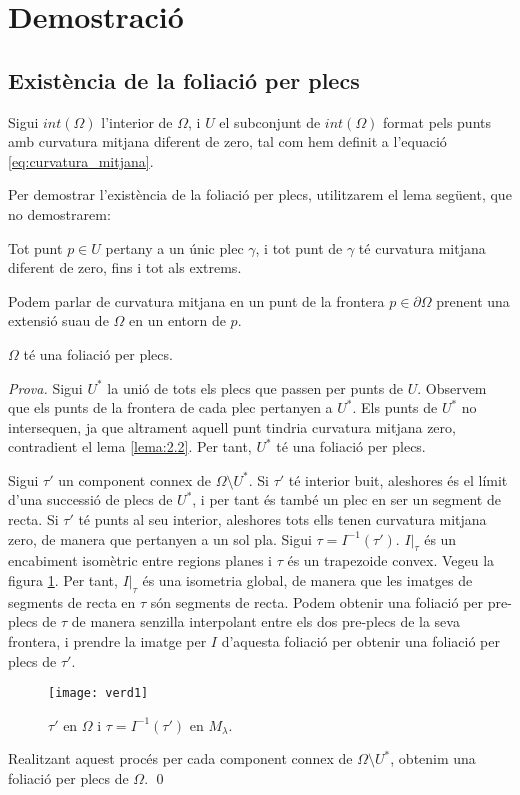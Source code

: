 \section{Demostració}
\subsection{Existència de la foliació per plecs}
Sigui $int(\Omega)$ l'interior de $\Omega$, i $U$ el subconjunt de $int(\Omega)$ format pels punts amb curvatura mitjana diferent de zero, tal com hem definit a l'equació \eqref{eq:curvatura_mitjana}.

Per demostrar l'existència de la foliació per plecs, utilitzarem el lema següent, que no demostrarem:
\begin{lema}\label{lema:2.2}
    Tot punt $p\in U$ pertany a un únic plec $\gamma$, i tot punt de $\gamma$ té curvatura mitjana diferent de zero, fins i tot als extrems.
\end{lema}
Podem parlar de curvatura mitjana en un punt de la frontera $p\in\partial \Omega$ prenent una extensió suau de $\Omega$ en un entorn de $p$.

\begin{teo}\label{teo:existencia_foliacio_plecs}
    $\Omega$ té una foliació per plecs.
\end{teo}
{
    \color{black}
    \textit{Prova.}
    Sigui $U^*$ la unió de tots els plecs que passen per punts de $U$. Observem que els punts de la frontera de cada plec pertanyen a $U^*$. Els punts de $U^*$ no intersequen, ja que altrament aquell punt tindria curvatura mitjana zero, contradient el lema \ref{lema:2.2}. Per tant, $U^*$ té una foliació per plecs. 

    Sigui $\tau'$ un component connex de $\Omega\setminus U^*$.
    Si $\tau'$ té interior buit, aleshores és el límit d'una successió de plecs de $U^*$, i per tant és també un plec en ser un segment de recta.
    Si $\tau'$ té punts al seu interior, aleshores tots ells tenen curvatura mitjana zero, de manera que pertanyen a un sol pla.
    Sigui $\tau = I^{-1}(\tau')$. $I|_{\tau}$ és un encabiment isomètric entre regions planes i $\tau$ és un trapezoide convex. Vegeu la figura \ref{fig:trapezoide}. Per tant, $I|_{\tau}$ és una isometria global, de manera que les imatges de segments de recta en $\tau$ són segments de recta. Podem obtenir una foliació per pre-plecs de $\tau$ de manera senzilla interpolant entre els dos pre-plecs de la seva frontera, i prendre la imatge per $I$ d'aquesta foliació per obtenir una foliació per plecs de $\tau'$.
    
    \begin{figure}[htbp]
        \centering
        \quad
        \quad
        \texttt{[image: verd1]}
        \caption{$\tau'$ en $\Omega$ i $\tau = I^{-1}(\tau')$ en $M_\lambda$.}
        \label{fig:trapezoide}
    \end{figure}

    Realitzant aquest procés per cada component connex de $\Omega\setminus U^*$, obtenim una foliació per plecs de $\Omega$.
    \qed
}
